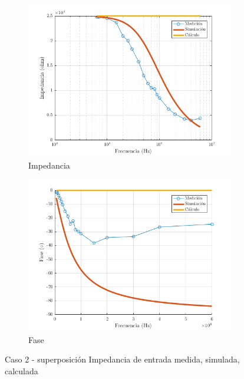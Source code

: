 \documentclass[../../main.tex]{subfiles}
\begin{document}
\begin{figure}[H]
\centering
\begin{subfigure}[http]{0.49\textwidth}
\includegraphics[width=\textwidth]{z_n_r_c2}
\caption{Impedancia}\label{fig=znZc2}
\end{subfigure}
\begin{subfigure}[http]{0.49\textwidth}
\includegraphics[width=\textwidth]{z_n_f_c2}
\caption{Fase} \label{fig=znFc2}
\end{subfigure}
\caption{Caso 2 - superposición Impedancia de entrada  medida, simulada, calculada}
\end{figure}
\end{document}
